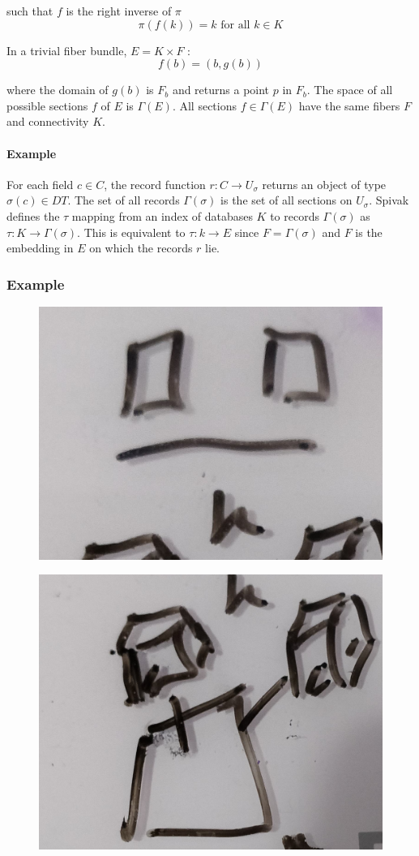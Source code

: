 \documentclass[../main.tex]{subfiles}
\begin{document}
such that $f$ is the right inverse of $\pi$
\begin{equation}
    \label{eq:section_domain}
    \pi(f(k)) = k \text{ for all } k \in K 
\end{equation}

In a trivial fiber bundle, $E = K \times F$ \cite{rowlandFiberBundle,FiberBundle2020}:
\begin{equation}
    \label{eq:section_return}
f(b) = (b, g(b))
\end{equation}

where the domain of $g(b)$ is $F_b$ and returns a point $p$ in $F_b$. The space of all possible sections $f$ of $E$ is $\Gamma(E)$. All sections $f \in \Gamma(E)$ have the same fibers $F$ and connectivity $K$. 
\paragraph{Example}

For each field $c \in C$, the record function $r: C \rightarrow U_{\sigma}$ returns an object of type $\sigma(c) \in DT$. The set of all records $\Gamma(\sigma)$ is the set of all sections on $U_\sigma$. Spivak defines the $\tau$ mapping from an index of databases $K$ to records $\Gamma(\sigma)$ as $\tau: K \rightarrow \Gamma(\sigma)$. This is equivalent to $\tau: k \rightarrow E$ since $F = \Gamma(\sigma)$ and $F$ is the embedding in $E$ on which the records $r$ lie.
 
\subsubsection{Example}
\begin{figure}[H]
    \includegraphics[width=0.2\linewidth]{figures/sections/math/temp_2f.png}
    \label{fig:}
\end{figure}
\begin{figure}[H]
    \includegraphics[width=0.2\linewidth]{figures/sections/math/temp_3f.png}
\end{figure}
\end{document}
